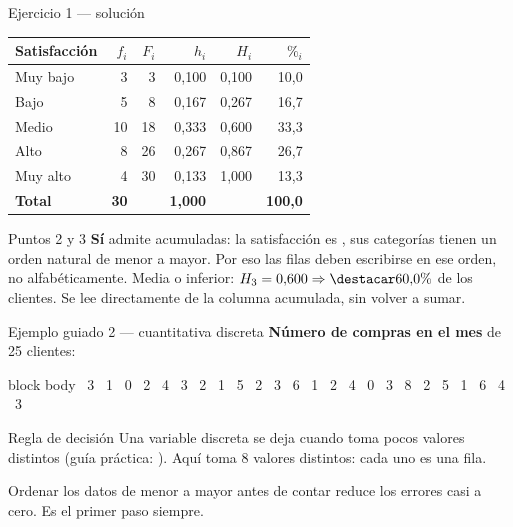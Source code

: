 \documentclass[aspectratio=169,10pt]{beamer}
\begin{document}
\begin{frame}{Ejercicio 1 — solución}
  \footnotesize
  \begin{center}
  \begin{tabular}{@{}lrrrrr@{}}
    \toprule
    \textbf{Satisfacción} & \textbf{$f_i$} & \textbf{$F_i$} & \textbf{$h_i$} &
    \textbf{$H_i$} & \textbf{$\%_i$} \\
    \midrule
    Muy bajo  &  3 &  3 & 0{,}100 & 0{,}100 & 10{,}0 \\
    Bajo      &  5 &  8 & 0{,}167 & 0{,}267 & 16{,}7 \\
    Medio     & 10 & 18 & 0{,}333 & 0{,}600 & 33{,}3 \\
    Alto      &  8 & 26 & 0{,}267 & 0{,}867 & 26{,}7 \\
    Muy alto  &  4 & 30 & 0{,}133 & 1{,}000 & 13{,}3 \\
    \midrule
    \textbf{Total} & \textbf{30} & & \textbf{1{,}000} & & \textbf{100{,}0} \\
    \bottomrule
  \end{tabular}
  \end{center}
  \vspace{0.2cm}
  \begin{exampleblock}{Puntos 2 y 3}
    \scriptsize
    \textbf{Sí} admite acumuladas: la satisfacción es , sus
    categorías tienen un orden natural de menor a mayor. Por eso las filas
    deben escribirse en ese orden, no alfabéticamente.
    \vspace{0.1cm}
    Media o inferior: $H_3 = 0{,}600 \Rightarrow \destacar{60{,}0\%}$ de los
    clientes. Se lee directamente de la columna acumulada, sin volver a sumar.
  \end{exampleblock}
\end{frame}

\begin{frame}{Ejemplo guiado 2 — cuantitativa discreta}
  \footnotesize
  \textbf{Número de compras en el mes} de 25 clientes:

  \vspace{0.15cm}
  \begin{beamercolorbox}[wd=\textwidth,sep=0.12cm]{block body}
    \centering\scriptsize{} \ 3 \ 1 \ 0 \ 2 \ 4 \ 3 \ 2 \ 1 \ 5 \ 2 \ 3 \ 6 \ 1 \ 2 \ 4 \ 0 \ 3 \ 8 \ 2 \ 5 \ 1 \ 6 \ 4 \ 3
  \end{beamercolorbox}

  \vspace{0.25cm}
  \begin{alertblock}{Regla de decisión}
    \footnotesize
    Una variable discreta se deja  cuando toma pocos
    valores distintos (guía práctica: ). Aquí toma 8 valores
    distintos: cada uno es una fila.
  \end{alertblock}

  \vspace{0.2cm}
  {\footnotesize\color{uniGris} Ordenar los datos de menor a mayor antes de
  contar reduce los errores casi a cero. Es el primer paso siempre.}
\end{frame}
\end{document}
